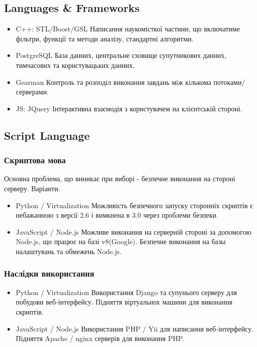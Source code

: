 \documentclass[final,12pt,aspectratio=43]{beamer}
\begin{document}
\subsection{Languages \& Frameworks}
\begin{frame}
    \begin{itemize}
        \item \colorbox{light-blue}{C++: STL/Boost/GSL} Написання наукомісткої частини, що включатиме фільтри, функції та методи аналізу, стандартні алгоритми.
        \item \colorbox{light-blue}{PostgreSQL} База данних, центральне сховище супутникових данних, тимчасових та користувацьких данних.
        \item \colorbox{light-blue}{Gearman} Контроль та розподіл виконання завдань між кількома потоками/серверами.
        \item \colorbox{light-blue}{JS: JQuery} Інтерактивна взаємодія з користувачем на клієнтській стороні.
    \end{itemize}
\end{frame}

\subsection{Script Language}
\begin{frame}
    \frametitle{Скриптова мова}
    Основна проблема, що виникає при виборі - безпечне виконання на стороні серверу. Варіанти.
    \begin{itemize}
        \item \colorbox{light-blue}{Python / Virtualization} Можливість безпечного запуску сторонніх скриптів є небажанною з версії 2.6 і вимкнена в 3.0 через проблеми безпеки.
        \item \colorbox{light-blue}{JavaScript / Node.js} Можливе виконання на серверній стороні за допомогою Node.js, що працює на базі v8(Google). Безпечне виконання на базы налаштувань та обмежень Node.js.
    \end{itemize}
\end{frame}

\begin{frame}
    \frametitle{Наслідки використання}
    \begin{itemize}
        \item \colorbox{light-blue}{Python / Virtualization} Використання Django та супунього серверу для побудови веб-інтерфейсу. Підняття віртуальнох машини для виконання скриптів.
        \item \colorbox{light-blue}{JavaScript / Node.js} Використання PHP / Yii для написання веб-інтерфейсу. Підняття Apache / nginx серверів для виконання PHP.
    \end{itemize}
\end{frame}
\end{document}
